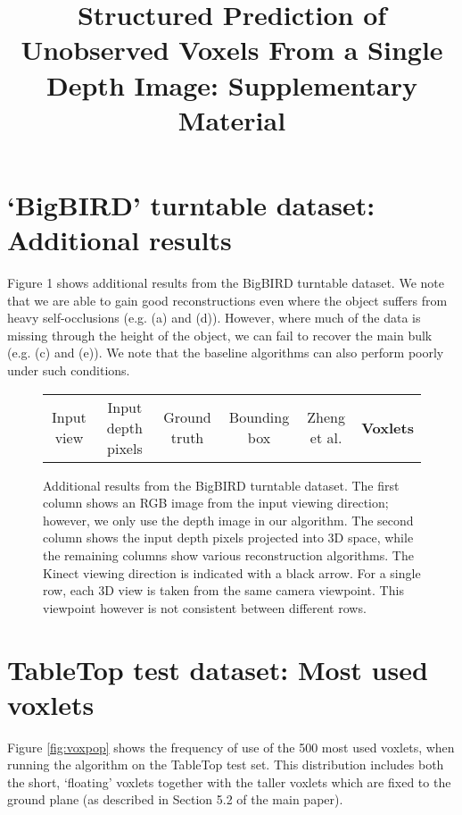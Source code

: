 \documentclass[10pt,onecolumn,letterpaper]{article}
\title{Structured Prediction of Unobserved Voxels From a Single Depth Image: Supplementary Material}
\makeatletter
\newcommand*{\ea}{et al.\@\xspace}
\makeatother
\begin{document}
\maketitle

\tableofcontents



\newpage
\section{`BigBIRD' turntable dataset: Additional results}

Figure 1 shows additional results from the BigBIRD turntable dataset.
We note that we are able to gain good reconstructions even where the object suffers from heavy self-occlusions  (e.g. (a) and (d)).
However, where much of the data is missing through the height of the object, we can fail to recover the main bulk (e.g. (c) and (e)).
We note that the baseline algorithms can also perform poorly under such conditions.

\newcommand{\turnheight}{0.12\columnwidth}
\begin{figure*}[h!]
\begin{tabular}{cccccc}
    
    Input view & Input depth pixels & Ground truth & Bounding box &  Zheng \ea & \textbf{Voxlets} \\
\end{tabular}
\label{fig:bb}
\caption{Additional results from the BigBIRD turntable dataset.
The first column shows an RGB image from the input viewing direction; however, we only use the depth image in our algorithm.
The second column shows the input depth pixels projected into 3D space, while the remaining columns show various reconstruction algorithms. The Kinect viewing direction is indicated with a black arrow.
For a single row, each 3D view is taken from the same camera viewpoint. This viewpoint however is not consistent between different rows.}
\end{figure*}



\newpage
\section{TableTop test dataset: Most used voxlets}

Figure \ref{fig:voxpop} shows the frequency of use of the 500 most used voxlets, when running the algorithm on the TableTop test set.
This distribution includes both the short, `floating' voxlets together with the taller voxlets which are fixed to the ground plane (as described in Section 5.2 of the main paper).
\end{document}
